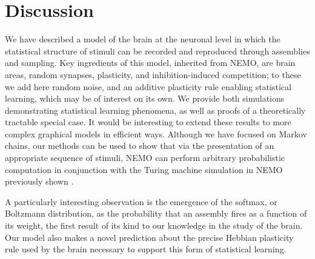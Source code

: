 \documentclass{article}
\theoremstyle{remark}
\newcommand{\1}{\mathbbm{1}}
\begin{document}
\section{Discussion}
We have described a model of the brain at the neuronal level in which the statistical structure of stimuli can be recorded and reproduced through assemblies and sampling. Key ingredients of this model, inherited from NEMO, are brain areas, random synapses, plasticity, and inhibition-induced competition; to these we add here random noise, and an additive plasticity rule enabling statistical learning, which may be of interest on its own.  We provide both simulations demonstrating statistical learning phenomena, as well as proofs of a theoretically tractable special case. It would be interesting to extend these results to more complex graphical models in efficient ways. Although we have focused on Markov chains, our methods can be used to show that via the presentation of an appropriate sequence of stimuli, NEMO can perform arbitrary probabilistic computation in conjunction with the Turing machine simulation in NEMO previously shown \cite{dabagia2024computation}. 

A particularly interesting observation is the emergence of the softmax, or Boltzmann distribution, as the probability that an assembly fires as a function of its weight, the first result of its kind to our knowledge in the study of the brain. Our model also makes a novel prediction about the precise Hebbian plasticity rule used by the brain necessary to support this form of statistical learning. %
\end{document}

